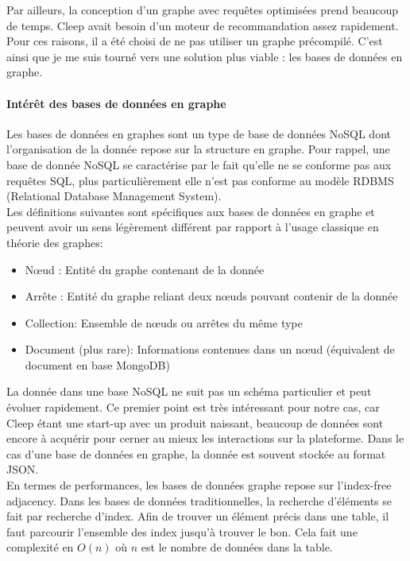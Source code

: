 \documentclass{article} %
\begin{document}
Par ailleurs, la conception d'un graphe avec requêtes optimisées prend beaucoup de temps. Cleep avait besoin d'un moteur de recommandation assez rapidement. Pour ces raisons, il a été choisi de ne pas utiliser un graphe précompilé. C'est ainsi que je me suis tourné vers une solution plus viable : les bases de données en graphe.

\paragraph{Intérêt des bases de données en graphe\\}
Les bases de données en graphes sont un type de base de données NoSQL dont l'organisation de la donnée repose sur la structure en graphe. Pour rappel, une base de donnée NoSQL se caractérise par le fait qu'elle ne se conforme pas aux requêtes SQL, plus particulièrement elle n'est pas conforme au modèle RDBMS (Relational Database Management System).\\
Les définitions suivantes sont spécifiques aux bases de données en graphe et peuvent avoir un sens légèrement différent par rapport à l'usage classique en théorie des graphes:
\begin{itemize}
  em
 \item Nœud : Entité du graphe contenant de la donnée
 \item Arrête : Entité du graphe reliant deux nœuds pouvant contenir de la donnée 
 \item Collection: Ensemble de nœuds ou arrêtes du même type
 \item Document (plus rare): Informations contenues dans un nœud (équivalent de document en base MongoDB) 
\end{itemize}
La donnée dans une base NoSQL ne suit pas un schéma particulier et peut évoluer rapidement. Ce premier point est très intéressant pour notre cas, car Cleep étant une start-up avec un produit naissant, beaucoup de données sont encore à acquérir pour cerner au mieux les interactions sur la plateforme. Dans le cas d'une base de données en graphe, la donnée est souvent stockée au format JSON.\\
En termes de performances, les bases de données graphe repose sur l'index-free adjacency. Dans les bases de données traditionnelles, la recherche d'éléments se fait par recherche d'index. Afin de trouver un élément précis dans une table, il faut parcourir l'ensemble des index jusqu'à trouver le bon. Cela fait une complexité en $O(n)$ où $n$ est le nombre de données dans la table.\\
\end{document}
